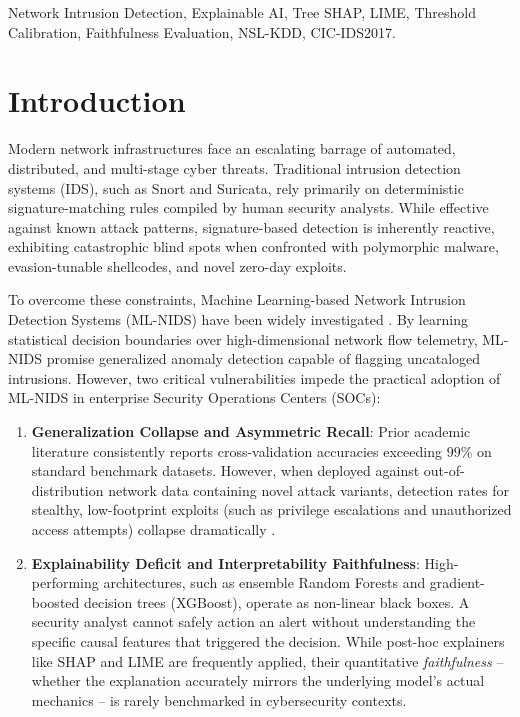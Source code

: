 \documentclass[conference]{IEEEtran}
\begin{document}
\begin{IEEEkeywords}
Network Intrusion Detection, Explainable AI, Tree SHAP, LIME, Threshold Calibration, Faithfulness Evaluation, NSL-KDD, CIC-IDS2017.
\end{IEEEkeywords}

\section{Introduction}

Modern network infrastructures face an escalating barrage of automated, distributed, and multi-stage cyber threats. Traditional intrusion detection systems (IDS), such as Snort and Suricata, rely primarily on deterministic signature-matching rules compiled by human security analysts. While effective against known attack patterns, signature-based detection is inherently reactive, exhibiting catastrophic blind spots when confronted with polymorphic malware, evasion-tunable shellcodes, and novel zero-day exploits.

To overcome these constraints, Machine Learning-based Network Intrusion Detection Systems (ML-NIDS) have been widely investigated \cite{sommer2010outside}. By learning statistical decision boundaries over high-dimensional network flow telemetry, ML-NIDS promise generalized anomaly detection capable of flagging uncataloged intrusions. However, two critical vulnerabilities impede the practical adoption of ML-NIDS in enterprise Security Operations Centers (SOCs):

\begin{enumerate}
    \item \textbf{Generalization Collapse and Asymmetric Recall}: Prior academic literature consistently reports cross-validation accuracies exceeding $99\%$ on standard benchmark datasets. However, when deployed against out-of-distribution network data containing novel attack variants, detection rates for stealthy, low-footprint exploits (such as privilege escalations and unauthorized access attempts) collapse dramatically \cite{tavallaee2009detailed}.
    \item \textbf{Explainability Deficit and Interpretability Faithfulness}: High-performing architectures, such as ensemble Random Forests and gradient-boosted decision trees (XGBoost), operate as non-linear black boxes. A security analyst cannot safely action an alert without understanding the specific causal features that triggered the decision. While post-hoc explainers like SHAP \cite{lundberg2017unified} and LIME \cite{ribeiro2016should} are frequently applied, their quantitative \textit{faithfulness} -- whether the explanation accurately mirrors the underlying model's actual mechanics -- is rarely benchmarked in cybersecurity contexts.
\end{enumerate}
\end{document}
